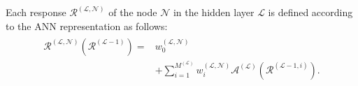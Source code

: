\documentclass[a4paper,fleqn]{article}
\begin{document}
Each response $\mathcal{R}^{(\mathcal{L},\mathcal{N})}$ of the node $\mathcal{N}$ in the hidden layer $\mathcal{L}$ is defined according to the ANN representation \cite{Goodfellow2016deeplearning} as follows:
%
%
%
\begin{eqnarray}
\label{DANN_NodeResponse}
\begin{aligned}
\mathcal{R}^{(\mathcal{L},\mathcal{N})}\left(\bm{\mathcal{R}}^{(\mathcal{L}-1)}\right) =  &w^{(\mathcal{L},\mathcal{N})}_{0} \\
&+ \sum_{i=1}^{M^{(\mathcal{L})}} w^{(\mathcal{L},\mathcal{N})}_{i} \mathcal{A}^{(\mathcal{L})}(\mathcal{R}^{(\mathcal{L}-1,i)}).
\end{aligned}
\end{eqnarray}
%
\end{document}
